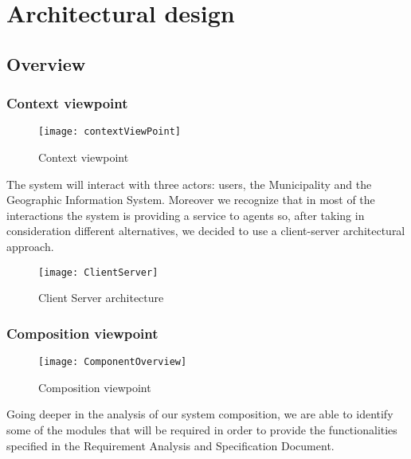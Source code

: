 \section{Architectural design}

\subsection{Overview}
	\subsubsection{Context viewpoint}
	
		\begin{figure}[h]
			\centering
			\texttt{[image: contextViewPoint]}
			\caption{
				\label{fig:contextViewPoint} 
				Context viewpoint
			}
		\end{figure}
		
		The system will interact with three actors: users, the Municipality and the Geographic Information System.
		Moreover we recognize that in most of the interactions the system is providing a service to agents so, after taking in consideration different alternatives, we decided to use a client-server architectural approach.

		\begin{figure}[h]
			\centering
			\texttt{[image: ClientServer]}
			\caption{
				\label{fig:ClientServer} 
				Client Server architecture
			}
		\end{figure}
		
	\subsubsection{Composition viewpoint}
	
		\begin{figure}[h]
			\centering
			\texttt{[image: ComponentOverview]}
			\caption{
				\label{fig:compositionViewPoint} 
				Composition viewpoint
			}
		\end{figure}
		  
		Going deeper in the analysis of our system composition, we are able to identify some of the modules that will be required in order to provide the functionalities specified in the Requirement Analysis and Specification Document. 
